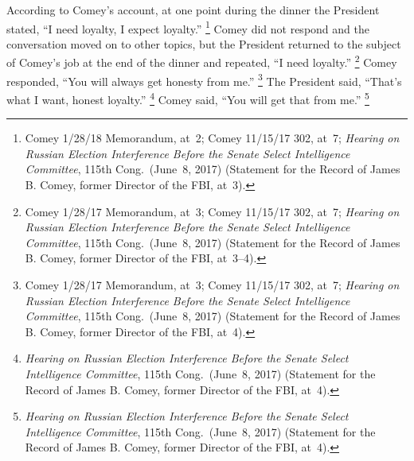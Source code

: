 According to Comey's account, at one point during the dinner the President stated, ``I need loyalty, I expect loyalty.''%
\footnote{Comey 1/28/18 Memorandum, at~2;
Comey 11/15/17 302, at~7;
\textit{Hearing on Russian Election Interference Before the Senate Select Intelligence Committee}, 115th Cong.\ (June~8, 2017) (Statement for the Record of James B. Comey, former Director of the FBI, at~3).}
Comey did not respond and the conversation moved on to other topics, but the President returned to the subject of Comey's job at the end of the dinner and repeated, ``I need loyalty.''%
\footnote{Comey 1/28/17 Memorandum, at~3;
Comey 11/15/17 302, at~7;
\textit{Hearing on Russian Election Interference Before the Senate Select Intelligence Committee}, 115th Cong.\ (June~8, 2017) (Statement for the Record of James B. Comey, former Director of the FBI, at~3--4).}
Comey responded, ``You will always get honesty from me.''%
\footnote{Comey 1/28/17 Memorandum, at~3;
Comey 11/15/17 302, at~7;
\textit{Hearing on Russian Election Interference Before the Senate Select Intelligence Committee}, 115th Cong.\ (June~8, 2017) (Statement for the Record of James B. Comey, former Director of the FBI, at~4).}
The President said, ``That's what I want, honest loyalty.''%
\footnote{\textit{Hearing on Russian Election Interference Before the Senate Select Intelligence Committee}, 115th Cong.\ (June~8, 2017) (Statement for the Record of James B. Comey, former Director of the FBI, at~4).}
Comey said, ``You will get that from me.''%
\footnote{\textit{Hearing on Russian Election Interference Before the Senate Select Intelligence Committee}, 115th Cong.\ (June~8, 2017) (Statement for the Record of James B. Comey, former Director of the FBI, at~4).}

